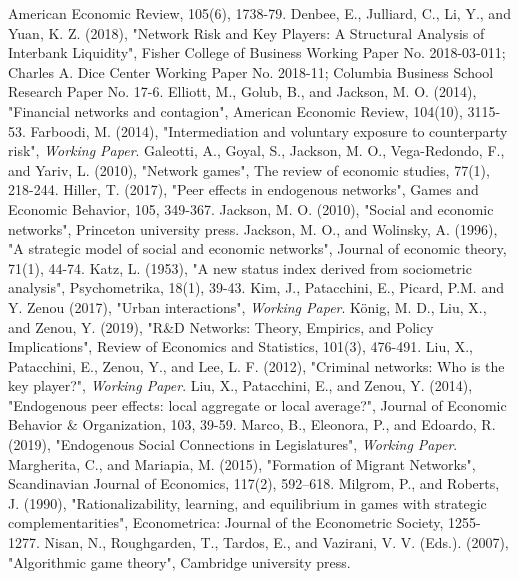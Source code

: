 \documentclass[12pt]{article}
\theoremstyle{definition}
\begin{document}
\begin{thebibliography}{99}
	American Economic Review, 105(6), 1738-79.
	Denbee, E., Julliard, C., Li, Y., and Yuan, K. Z. (2018),
	"Network Risk and Key Players: A Structural Analysis of Interbank Liquidity",
	Fisher College of Business Working Paper No. 2018-03-011;
	Charles A. Dice Center Working Paper No. 2018-11;
	Columbia Business School Research Paper No. 17-6. 
	Elliott, M., Golub, B., and Jackson, M. O. (2014),
	"Financial networks and contagion",
	American Economic Review, 104(10), 3115-53.
	Farboodi, M. (2014),
	"Intermediation and voluntary exposure to counterparty risk",
	\textit{Working Paper}.
	Galeotti, A., Goyal, S., Jackson, M. O., Vega-Redondo, F., and Yariv, L. (2010),
	"Network games",
	The review of economic studies, 77(1), 218-244.
	Hiller, T. (2017),
	"Peer effects in endogenous networks",
	Games and Economic Behavior, 105, 349-367.
	Jackson, M. O. (2010),
	"Social and economic networks",
	Princeton university press.
	Jackson, M. O., and Wolinsky, A. (1996),
	"A strategic model of social and economic networks",
	Journal of economic theory, 71(1), 44-74.
	Katz, L. (1953),
	"A new status index derived from sociometric analysis",
	Psychometrika, 18(1), 39-43.
	Kim, J., Patacchini, E., Picard, P.M. and Y. Zenou (2017),
	"Urban interactions",
	\textit{Working Paper}.
	K\"{o}nig, M. D., Liu, X., and Zenou, Y. (2019),
	"R\&D Networks: Theory, Empirics, and Policy Implications",
	Review of Economics and Statistics, 101(3), 476-491.
	Liu, X., Patacchini, E., Zenou, Y., and Lee, L. F. (2012),
	"Criminal networks: Who is the key player?",
	\textit{Working Paper}.
	Liu, X., Patacchini, E., and Zenou, Y. (2014),
	"Endogenous peer effects: local aggregate or local average?",
	Journal of Economic Behavior \& Organization, 103, 39-59.
	Marco, B., Eleonora, P., and Edoardo, R. (2019),
	"Endogenous Social Connections in Legislatures",
	\textit{Working Paper}.
	Margherita, C., and Mariapia, M. (2015),
	"Formation of Migrant  Networks",
	Scandinavian Journal of Economics, 117(2), 592–618.
	Milgrom, P., and Roberts, J. (1990),
	"Rationalizability, learning, and equilibrium in games with strategic complementarities",
	Econometrica: Journal of the Econometric Society, 1255-1277.
	Nisan, N., Roughgarden, T., Tardos, E., and Vazirani, V. V. (Eds.). (2007),
	"Algorithmic game theory",
	Cambridge university press.

\end{thebibliography}
\end{document}
